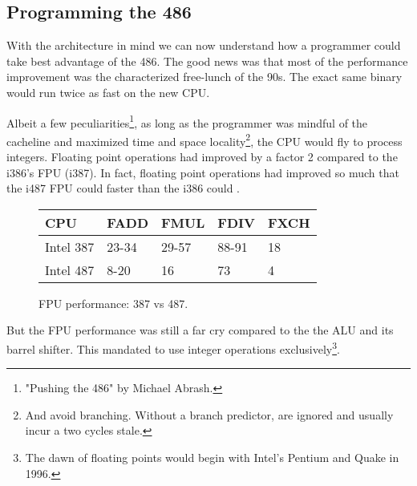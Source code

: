 \subsection{Programming the 486}
With the architecture in mind we can now understand how a programmer could take best advantage of the 486. The good news was that most of the performance improvement was the characterized free-lunch of the 90s. The exact same binary would run twice as fast on the new CPU.\\
\par
Albeit a few peculiarities\footnote{"Pushing the 486" by Michael Abrash.}, as long as the programmer was mindful of the cacheline and maximized time and space locality\footnote{And avoid branching. Without a branch predictor,  are ignored and usually incur a two cycles stale.}, the CPU would fly to process integers. Floating point operations had improved by a factor 2 compared to the i386's FPU (i387). In fact, floating point operations had improved so much that the i487 FPU could  faster than the i386 could .\\
\par
\begin{figure}[H]
\centering
\begin{tabularx}{\textwidth}{ X  X X  X  X}
  \toprule
  \textbf{CPU} & \textbf{FADD} & \textbf{FMUL} & \textbf{FDIV} &\textbf{FXCH} \\ \bottomrule
Intel 387 & 23-34 & 29-57   & 88-91 & 18 \\
Intel 487 & 8-20  & 16   & 73 & 4 \\ \bottomrule
\end{tabularx}
\caption{FPU performance: 387 vs 487.}

\end{figure}

\par
But the FPU performance was still a far cry compared to the the ALU and its barrel shifter. This mandated \doom{} to use integer operations exclusively\footnote{The dawn of floating points would begin with Intel's Pentium and Quake in 1996.}.\\

